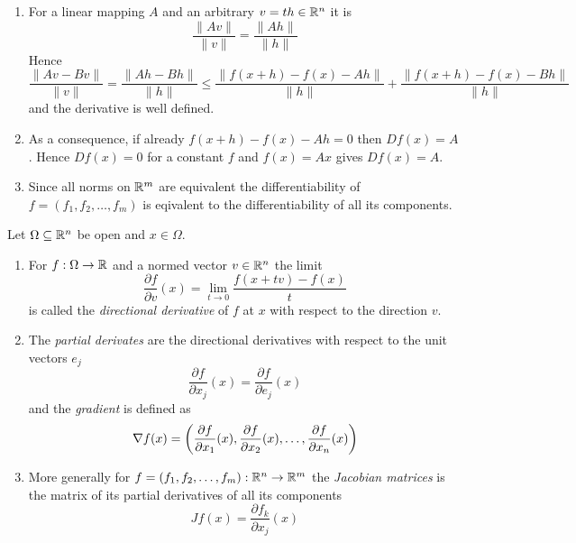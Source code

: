 \begin{remarks}\hfill
    \begin{enumerate}
        \item For a linear mapping \( A \) and an arbitrary \( v = th \in \mathbb{R}^n \) it is
              \[
                  \frac{\|Av\|}{\|v\|} = \frac{\|Ah\|}{\|h\|}
              \]
              Hence
              \[
                  \frac{\|Av - Bv\|}{\|v\|} = \frac{\|Ah - Bh\|}{\|h\|}\le
                  \frac{\|f(x + h) - f(x) - Ah\|}{\|h\|} + \frac{\|f(x + h) - f(x) - Bh\|}{\|h\|}
              \]
              and the derivative is well defined.
        \item As a consequence, if already \( f(x + h) - f(x) - Ah = 0 \) then \( Df(x) = A \).
              Hence \( Df(x) = 0 \) for a constant  \( f \) and \( f(x) = Ax \) gives \( Df(x) = A \).
        \item Since all norms on \( \mathbb{R}^m \) are equivalent the differentiability of \( f = (f_1, f_2, \dots, f_m) \)
              is eqivalent to the differentiability of all its components.
    \end{enumerate}
\end{remarks}
\bigskip


\begin{definition}
    Let \( \Omega \subseteq \mathbb{R}^n \) be open and \( x \in \Omega \).
    \begin{enumerate}
        \item For \( f : \Omega \to \mathbb{R} \) and a normed vector \( v \in \mathbb{R}^n \) the limit
              \[
                  \frac{\partial f}{\partial v}(x) = \lim_{t \to 0} \frac{f(x + tv) - f(x)}{t}
              \]
              is called the \emph{directional derivative} of \( f \) at \( x \)
              with respect to the direction \( v \).
        \item The \emph{partial derivates} are the directional derivatives with respect to the
              unit vectors \( e_j \)
              \[
                  \frac{\partial f}{\partial x_j}(x) = \frac{\partial f}{\partial e_j}(x)
              \]
              and the  \emph{gradient} is defined as
              \[
                  \nabla f(x) = \left(\frac{\partial f}{\partial x_1}(x),
                  \frac{\partial f}{\partial x_2}(x), \dots , \frac{\partial f}{\partial x_n}(x)\right)
              \]
        \item More generally for \( f = (f_1, f_2, \dots, f_m): \mathbb{R}^n \to \mathbb{R}^m \) the \emph{Jacobian matrices} 
        is the matrix of its partial derivatives of all its components
        \[
            Jf(x) = \frac{\partial f_k}{\partial x_j}(x)
        \]
    \end{enumerate}
\end{definition}
\bigskip


